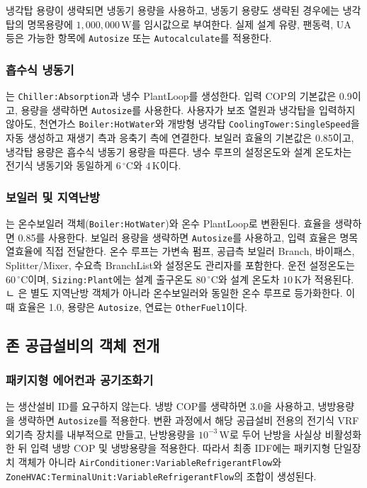 냉각탑 용량이 생략되면 냉동기 용량을 사용하고, 냉동기 용량도 생략된 경우에는 냉각탑의 명목용량에 $1{,}000{,}000\,\mathrm{W}$를 임시값으로 부여한다. 실제 설계 유량, 팬동력, UA 등은 가능한 항목에 \texttt{Autosize} 또는 \texttt{Autocalculate}를 적용한다.

\subsubsection{흡수식 냉동기}

는 \texttt{Chiller:Absorption}과 냉수 PlantLoop를 생성한다. 입력 COP의 기본값은 0.9이고, 용량을 생략하면 \texttt{Autosize}를 사용한다. 사용자가 보조 열원과 냉각탑을 입력하지 않아도, 천연가스 \texttt{Boiler:HotWater}와 개방형 냉각탑 \texttt{CoolingTower:SingleSpeed}을 자동 생성하고 재생기 측과 응축기 측에 연결한다. 보일러 효율의 기본값은 0.85이고, 냉각탑 용량은 흡수식 냉동기 용량을 따른다. 냉수 루프의 설정온도와 설계 온도차는 전기식 냉동기와 동일하게 $6\,^{\circ}\mathrm{C}$와 $4\,\mathrm{K}$이다.

\subsubsection{보일러 및 지역난방}

는 온수보일러 객체(\texttt{Boiler:}\allowbreak\texttt{HotWater})와 온수 PlantLoop로 변환된다. 효율을 생략하면 0.85를 사용한다. 보일러 용량을 생략하면 \texttt{Autosize}를 사용하고, 입력 효율은 명목 열효율에 직접 전달한다. 온수 루프는 가변속 펌프, 공급측 보일러 Branch, 바이패스, Splitter/Mixer, 수요측 BranchList와 설정온도 관리자를 포함한다. 운전 설정온도는 $60\,^{\circ}\mathrm{C}$이며, \texttt{Sizing:Plant}에는 설계 출구온도 $80\,^{\circ}\mathrm{C}$와 설계 온도차 $10\,\mathrm{K}$가 적용된다.
ㄴ
은 별도 지역난방 객체가 아니라 온수보일러와 동일한 온수 루프로 등가화한다. 이때 효율은 1.0, 용량은 \texttt{Autosize}, 연료는 \texttt{OtherFuel1}이다.

\subsection{존 공급설비의 객체 전개}

\subsubsection{패키지형 에어컨과 공기조화기}

는 생산설비 ID를 요구하지 않는다. 냉방 COP를 생략하면 3.0을 사용하고, 냉방용량을 생략하면 \texttt{Autosize}를 적용한다. 변환 과정에서 해당 공급설비 전용의 전기식 VRF 외기측 장치를 내부적으로 만들고, 난방용량을 $10^{-3}\,\mathrm{W}$로 두어 난방을 사실상 비활성화한 뒤 입력 냉방 COP 및 냉방용량을 적용한다. 따라서 최종 IDF에는 패키지형 단일장치 객체가 아니라 \texttt{AirConditioner:}\allowbreak\texttt{Variable}\allowbreak\texttt{Refrigerant}\allowbreak\texttt{Flow}와 \texttt{ZoneHVAC:}\allowbreak\texttt{TerminalUnit:}\allowbreak\texttt{Variable}\allowbreak\texttt{Refrigerant}\allowbreak\texttt{Flow}의 조합이 생성된다.

